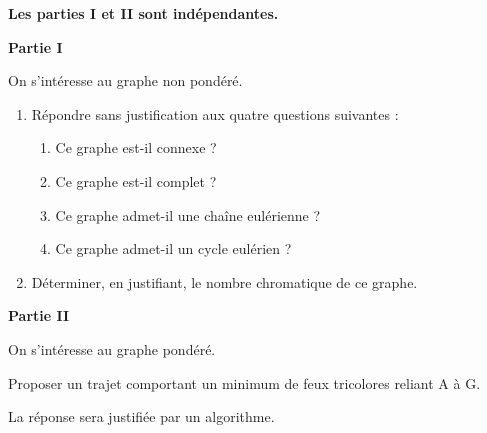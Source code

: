 \begin{center}
\end{center}
\textbf{Les parties I et II sont indépendantes.}
\par
\textbf{Partie I}
\par
On s'intéresse au graphe non pondéré.
\begin{enumerate}
     \item
     Répondre sans justification aux quatre questions suivantes :
     \begin{enumerate}[label=\alph*.]
          \item
          Ce graphe est-il connexe ?
          \item
          Ce graphe est-il complet ?
          \item
          Ce graphe admet-il une chaîne eulérienne ?
          \item
          Ce graphe admet-il un cycle eulérien ?
     \end{enumerate}
     \item
     Déterminer, en justifiant, le nombre chromatique de ce graphe.
\end{enumerate}
\par      
\textbf{Partie II}
\par
On s'intéresse au graphe pondéré.
\par
Proposer un trajet comportant un minimum de feux tricolores reliant A à G.
\par
La réponse sera justifiée par un algorithme.
